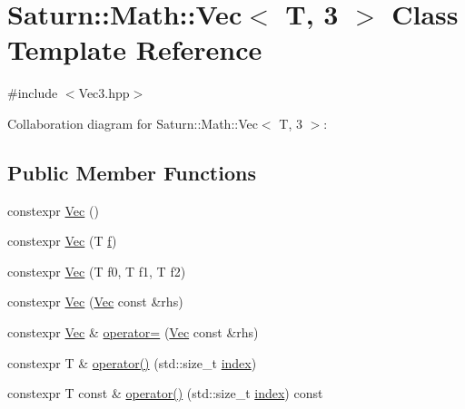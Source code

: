 \hypertarget{class_saturn_1_1_math_1_1_vec_3_01_t_00_013_01_4}{}\section{Saturn\+:\+:Math\+:\+:Vec$<$ T, 3 $>$ Class Template Reference}
\label{class_saturn_1_1_math_1_1_vec_3_01_t_00_013_01_4}


{\ttfamily \#include $<$Vec3.\+hpp$>$}



Collaboration diagram for Saturn\+:\+:Math\+:\+:Vec$<$ T, 3 $>$\+:
\subsection*{Public Member Functions}
\begin{DoxyCompactItemize}
\item 
constexpr \mbox{\hyperlink{class_saturn_1_1_math_1_1_vec_3_01_t_00_013_01_4_a8e578ef15ecacc4c9c9f3ec5604c95ef}{Vec}} ()
\item 
constexpr \mbox{\hyperlink{class_saturn_1_1_math_1_1_vec_3_01_t_00_013_01_4_adb2a651b5f482e10419e828a7e5e87e1}{Vec}} (T \mbox{\hyperlink{glad_8h_a6a8efad2e332fcd916bde9e19ddef215}{f}})
\item 
constexpr \mbox{\hyperlink{class_saturn_1_1_math_1_1_vec_3_01_t_00_013_01_4_ada3b3af450ea22cc76fb53c9da7852f4}{Vec}} (T f0, T f1, T f2)
\item 
constexpr \mbox{\hyperlink{class_saturn_1_1_math_1_1_vec_3_01_t_00_013_01_4_adac5c515cf84190911cd6238c9e12eb2}{Vec}} (\mbox{\hyperlink{class_saturn_1_1_math_1_1_vec}{Vec}} const \&rhs)
\item 
constexpr \mbox{\hyperlink{class_saturn_1_1_math_1_1_vec}{Vec}} \& \mbox{\hyperlink{class_saturn_1_1_math_1_1_vec_3_01_t_00_013_01_4_a7be2708d9c39bb58d97e4a3e896c4740}{operator=}} (\mbox{\hyperlink{class_saturn_1_1_math_1_1_vec}{Vec}} const \&rhs)
\item 
constexpr T \& \mbox{\hyperlink{class_saturn_1_1_math_1_1_vec_3_01_t_00_013_01_4_a253127c85e1c5b60f6e241ff8b5d702b}{operator()}} (std\+::size\+\_\+t \mbox{\hyperlink{glad_8h_ab47dd9958bcadea08866b42bf358e95e}{index}})
\item 
constexpr T const  \& \mbox{\hyperlink{class_saturn_1_1_math_1_1_vec_3_01_t_00_013_01_4_a2c983a60a8b9c913768fc472346cef48}{operator()}} (std\+::size\+\_\+t \mbox{\hyperlink{glad_8h_ab47dd9958bcadea08866b42bf358e95e}{index}}) const
\end{DoxyCompactItemize}
